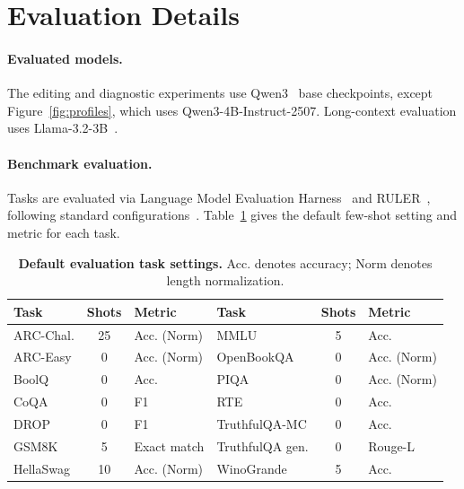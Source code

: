 \appendix
\clearpage
\raggedcolsend
\raggedend
\raggedbottom

\setlength{\textfloatsep}{6pt plus 2pt minus 1pt}
\setlength{\floatsep}{4pt plus 2pt minus 1pt}
\setlength{\intextsep}{7pt plus 2pt minus 1pt}
\setlength{\dbltextfloatsep}{7pt plus 2pt minus 1pt}
\setlength{\dblfloatsep}{5pt plus 2pt minus 1pt}
\makeatletter
\setlength{\@dblfptop}{0pt}
\setlength{\@dblfpsep}{10pt}
\setlength{\@dblfpbot}{0pt plus 1fil}
\makeatother

\section{Evaluation Details}
\label{app:evaluation-details}

\paragraph{Evaluated models.}
The editing and diagnostic experiments use Qwen3~\citep{Yang2025Qwen3TR} base
checkpoints, except Figure~\ref{fig:profiles}, which uses Qwen3-4B-Instruct-2507.
Long-context evaluation uses Llama-3.2-3B~\citep{Dubey2024TheL3}.

\paragraph{Benchmark evaluation.}
Tasks are evaluated via Language Model Evaluation Harness~\citep{eval-harness}
and RULER~\citep{Hsieh2024RULERWT}, following standard configurations~\citep{Wang2018GLUEAM,
Hendrycks2020MeasuringMM,Cobbe2021TrainingVT,reddy-etal-2019-coqa,dua-etal-2019-drop,
lin-etal-2022-truthfulqa,Clark2018ThinkYH,Zellers2019HellaSwagCA}.
Table~\ref{tab:evaluation-task-settings} gives the default few-shot setting and
metric for each task.

\begin{table}[H]
  \centering
  \scriptsize
  \setlength{\tabcolsep}{1.8pt}
  \caption{\textbf{Default evaluation task settings.} Acc. denotes accuracy;
  Norm denotes length normalization.}
  \label{tab:evaluation-task-settings}
  \begin{tabular}{@{}lcl@{\hspace{6pt}}lcl@{}}
    \toprule
    Task & Shots & Metric & Task & Shots & Metric \\
    \midrule
    ARC-Chal. & 25 & Acc. (Norm) & MMLU & 5 & Acc. \\
    ARC-Easy & 0 & Acc. (Norm) & OpenBookQA & 0 & Acc. (Norm) \\
    BoolQ & 0 & Acc. & PIQA & 0 & Acc. (Norm) \\
    CoQA & 0 & F1 & RTE & 0 & Acc. \\
    DROP & 0 & F1 & TruthfulQA-MC & 0 & Acc. \\
    GSM8K & 5 & Exact match & TruthfulQA gen. & 0 & Rouge-L \\
    HellaSwag & 10 & Acc. (Norm) & WinoGrande & 5 & Acc. \\
    \bottomrule
  \end{tabular}
  \normalsize
\end{table}

